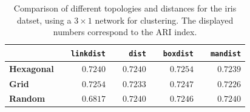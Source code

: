 \documentclass[a4paper, 10pt]{article}
\begin{document}
  \begin{table}[h]
    \centering
    \begin{tabular}{@{}llrrrrrrr@{}}
      \toprule
      & \phantom{ab}  & \texttt{linkdist} & \phantom{ab} & \texttt{dist} & 
      \phantom{ab} & \texttt{boxdist} & \phantom{ab} & \texttt{mandist} \\
      \midrule
      \textbf{Hexagonal} &&  $0.7240$  &&   $0.7240$  &&   $0.7254$  &&  $0.7239$\\
      \textbf{Grid}      &&  $0.7254$  &&   $0.7233$  &&   $0.7247$  &&  $0.7226$\\
      \textbf{Random}    &&  $0.6817$  &&   $0.7240$  &&   $0.7246$  &&  $0.7240$\\
      \bottomrule
    \end{tabular} 
    \caption{Comparison of different topologies and distances for the iris datset,
    using a $3 \times 1$ network for clustering. The displayed numbers correspond 
  to the ARI index.}
    \label{fig:l3_som_grid}
  \end{table}




    
    
    
    
    
    
    
    
    
\end{document}
